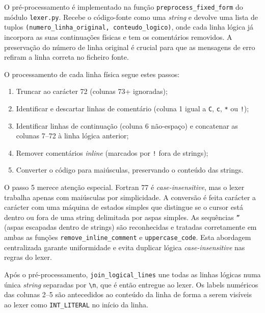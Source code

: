 \documentclass[a4paper]{article}
\begin{document}
\noindent O pré-processamento é implementado na função \texttt{preprocess\_fixed\_form} do módulo \texttt{lexer.py}. Recebe o código-fonte como uma \textit{string} e devolve uma lista de tuplos \texttt{(numero\_linha\_original, conteudo\_logico)}, onde cada linha lógica já incorpora as suas continuações físicas e tem os comentários removidos. A preservação do número de linha original é crucial para que as mensagens de erro refiram a linha correta no ficheiro fonte.

\vspace{0.2cm}

\noindent O processamento de cada linha física segue estes passos:

\begin{enumerate}
    \item Truncar ao carácter 72 (colunas 73+ ignoradas);
    \item Identificar e descartar linhas de comentário (coluna 1 igual a \texttt{C}, \texttt{c}, \texttt{*} ou \texttt{!});
    \item Identificar linhas de continuação (coluna 6 não-espaço) e concatenar as colunas 7--72 à linha lógica anterior;
    \item Remover comentários \textit{inline} (marcados por \texttt{!} fora de strings);
    \item Converter o código para maiúsculas, preservando o conteúdo das strings.
\end{enumerate}

\noindent O passo 5 merece atenção especial. Fortran 77 é \textit{case-insensitive}, mas o lexer trabalha apenas com maiúsculas por simplicidade. A conversão é feita carácter a carácter com uma máquina de estados simples que distingue se o cursor está dentro ou fora de uma string delimitada por aspas simples. As sequências \texttt{''} (aspas escapadas dentro de strings) são reconhecidas e tratadas corretamente em ambas as funções \texttt{remove\_inline\_comment} e \texttt{uppercase\_code}. Esta abordagem centralizada garante uniformidade e evita duplicar lógica \textit{case-insensitive} nas regras do lexer.

\vspace{0.2cm}

\noindent Após o pré-processamento, \texttt{join\_logical\_lines} une todas as linhas lógicas numa única \textit{string} separadas por \texttt{\textbackslash{}n}, que é então entregue ao lexer. Os labels numéricos das colunas 2--5 são antecedidos ao conteúdo da linha de forma a serem visíveis ao lexer como \texttt{INT\_LITERAL} no início da linha.
\end{document}
